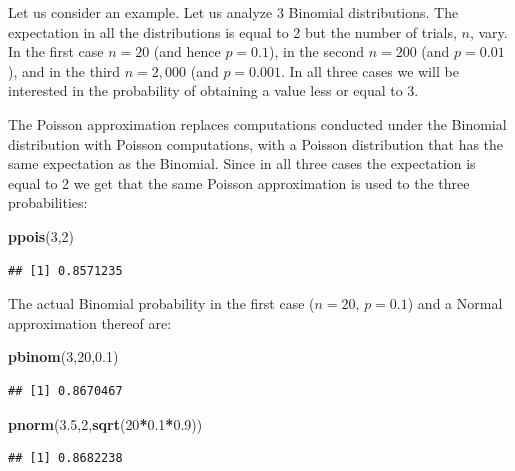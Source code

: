 \documentclass[
]{krantz}
\makeatletter
\newenvironment{Shaded}{\begin{snugshade}}{\end{snugshade}}
\newcommand{\DecValTok}[1]{\textcolor[rgb]{0.00,0.00,0.81}{#1}}
\newcommand{\FloatTok}[1]{\textcolor[rgb]{0.00,0.00,0.81}{#1}}
\newcommand{\KeywordTok}[1]{\textcolor[rgb]{0.13,0.29,0.53}{\textbf{#1}}}
\newcommand{\NormalTok}[1]{#1}
\newcommand{\OperatorTok}[1]{\textcolor[rgb]{0.81,0.36,0.00}{\textbf{#1}}}
\newenvironment{kframe}{%
\medskip{}
\setlength{\fboxsep}{.8em}
 \def\at@end@of@kframe{}%
 \ifinner\ifhmode%
  \def\at@end@of@kframe{\end{minipage}}%
  \begin{minipage}{\columnwidth}%
 \fi\fi%
 \def\FrameCommand##1{\hskip\@totalleftmargin \hskip-\fboxsep
 \colorbox{shadecolor}{##1}\hskip-\fboxsep
     \hskip-\linewidth \hskip-\@totalleftmargin \hskip\columnwidth}%
 \MakeFramed {\advance\hsize-\width
   \@totalleftmargin\z@ \linewidth\hsize
   \@setminipage}}%
 {\par\unskip\endMakeFramed%
 \at@end@of@kframe}
\renewenvironment{Shaded}{\begin{kframe}}{\end{kframe}}
\theoremstyle{definition}
\theoremstyle{definition}
\theoremstyle{definition}
\theoremstyle{remark}
\makeatother
\begin{document}
Let us consider an example. Let us analyze 3 Binomial distributions. The
expectation in all the distributions is equal to 2 but the number of
trials, \(n\), vary. In the first case \(n=20\) (and hence \(p=0.1\)), in the
second \(n=200\) (and \(p=0.01\)), and in the third \(n=2,000\) (and
\(p=0.001\). In all three cases we will be interested in the probability
of obtaining a value less or equal to 3.

The Poisson approximation replaces computations conducted under the
Binomial distribution with Poisson computations, with a Poisson
distribution that has the same expectation as the Binomial. Since in all
three cases the expectation is equal to 2 we get that the same Poisson
approximation is used to the three probabilities:

\begin{Shaded}
\begin{Highlighting}[]
\KeywordTok{ppois}\NormalTok{(}\DecValTok{3}\NormalTok{,}\DecValTok{2}\NormalTok{)}
\end{Highlighting}
\end{Shaded}

\begin{verbatim}
## [1] 0.8571235
\end{verbatim}

The actual Binomial probability in the first case (\(n=20\), \(p=0.1\)) and
a Normal approximation thereof are:

\begin{Shaded}
\begin{Highlighting}[]
\KeywordTok{pbinom}\NormalTok{(}\DecValTok{3}\NormalTok{,}\DecValTok{20}\NormalTok{,}\FloatTok{0.1}\NormalTok{)}
\end{Highlighting}
\end{Shaded}

\begin{verbatim}
## [1] 0.8670467
\end{verbatim}

\begin{Shaded}
\begin{Highlighting}[]
\KeywordTok{pnorm}\NormalTok{(}\FloatTok{3.5}\NormalTok{,}\DecValTok{2}\NormalTok{,}\KeywordTok{sqrt}\NormalTok{(}\DecValTok{20}\OperatorTok{*}\FloatTok{0.1}\OperatorTok{*}\FloatTok{0.9}\NormalTok{))}
\end{Highlighting}
\end{Shaded}

\begin{verbatim}
## [1] 0.8682238
\end{verbatim}
\end{document}
